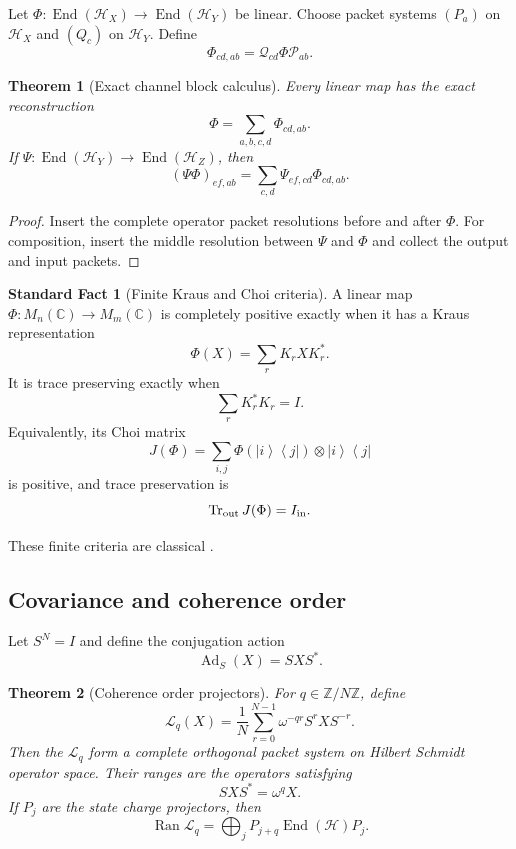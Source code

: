 \documentclass{aomart}
\newtheorem{theorem}{Theorem}[section]
\theoremstyle{definition}
\newtheorem{standardfact}[standardfact]{Standard Fact}
\theoremstyle{remark}
\newcommand{\CC}{\mathbb C}
\newcommand{\ZZ}{\mathbb Z}
\newcommand{\Hcal}{\mathcal H}
\newcommand{\Lcal}{\mathcal L}
\newcommand{\Pcal}{\mathcal P}
\newcommand{\Qcal}{\mathcal Q}
\newcommand{\End}{\operatorname{End}}
\newcommand{\Ran}{\operatorname{Ran}}
\newcommand{\Tr}{\operatorname{Tr}}
\newcommand{\ket}[1]{\left|#1\right\rangle}
\newcommand{\bra}[1]{\left\langle#1\right|}
\newcommand{\Ad}{\operatorname{Ad}}
\begin{document}
Let \(\Phi:\End(\Hcal_X)\to\End(\Hcal_Y)\) be linear. Choose packet systems \((P_a)\) on \(\Hcal_X\) and \((Q_c)\) on \(\Hcal_Y\). Define
\[
\Phi_{cd,ab}
=
\Qcal_{cd}\Phi\Pcal_{ab}.
\]

\begin{theorem}[Exact channel block calculus]\label{thm:channel_blocks}
Every linear map has the exact reconstruction
\[
\Phi=\sum_{a,b,c,d}\Phi_{cd,ab}.
\]
If \(\Psi:\End(\Hcal_Y)\to\End(\Hcal_Z)\), then
\[
(\Psi\Phi)_{ef,ab}
=
\sum_{c,d}
\Psi_{ef,cd}\Phi_{cd,ab}.
\]
\end{theorem}

\begin{proof}
Insert the complete operator packet resolutions before and after \(\Phi\). For composition, insert the middle resolution between \(\Psi\) and \(\Phi\) and collect the output and input packets.
\end{proof}

\begin{standardfact}[Finite Kraus and Choi criteria]\label{fact:kraus_choi}
A linear map \(\Phi:M_n(\CC)\to M_m(\CC)\) is completely positive exactly when it has a Kraus representation
\[
\Phi(X)=\sum_rK_rXK_r^*.
\]
It is trace preserving exactly when
\[
\sum_rK_r^*K_r=I.
\]
Equivalently, its Choi matrix
\[
J(\Phi)
=
\sum_{i,j}\Phi(\ket{i}\bra{j})\otimes\ket{i}\bra{j}
\]
is positive, and trace preservation is
\[
\Tr_{\rm out}J(\Phi)=I_{\rm in}.
\]
\end{standardfact}

These finite criteria are classical \cite{Stinespring1955,Choi1975,Kraus1983,Watrous2018}.

\subsection{Covariance and coherence order}\label{subsec:channel_covariance}

Let \(S^N=I\) and define the conjugation action
\[
\Ad_S(X)=SXS^*.
\]

\begin{theorem}[Coherence order projectors]\label{thm:coherence_projectors}
For \(q\in\ZZ/N\ZZ\), define
\[
\Lcal_q(X)
=
\frac1N
\sum_{r=0}^{N-1}
\omega^{-qr}S^rXS^{-r}.
\]
Then the \(\Lcal_q\) form a complete orthogonal packet system on Hilbert Schmidt operator space. Their ranges are the operators satisfying
\[
SXS^*=\omega^qX.
\]
If \(P_j\) are the state charge projectors, then
\[
\Ran\Lcal_q
=
\bigoplus_jP_{j+q}\End(\Hcal)P_j.
\]
\end{theorem}
\end{document}
